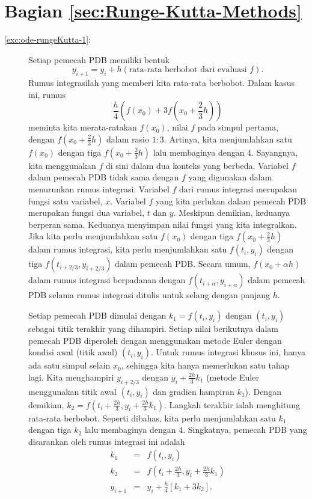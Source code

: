 \section*{Bagian \ref{sec:Runge-Kutta-Methods}}
\begin{description}
\item [{\ref{exc:ode-rungeKutta-1}:}] Setiap pemecah PDB memiliki bentuk
\[
y_{i+1}=y_{i}+h(\mbox{rata-rata berbobot dari evaluasi }f).
\]
Rumus integrasilah yang memberi kita rata-rata berbobot. Dalam kasus
ini, rumus 
\[
\frac{h}{4}\left(f(x_{0})+3f\left(x_{0}+\frac{2}{3}h\right)\right)
\]
 meminta kita merata-ratakan $f(x_{0})$, nilai $f$ pada simpul pertama,
dengan $f(x_{0}+\frac{2}{3}h)$ dalam rasio $1:3$. Artinya, kita
menjumlahkan satu $f(x_{0})$ dengan tiga $f(x_{0}+\frac{2}{3}h)$
lalu membaginya dengan 4. Sayangnya, kita menggunakan $f$ di sini
dalam dua konteks yang berbeda. Variabel $f$ dalam pemecah PDB tidak
sama dengan $f$ yang digunakan dalam menurunkan rumus integrasi.
Variabel $f$ dari rumus integrasi merupakan fungsi satu variabel,
$x$. Variabel $f$ yang kita perlukan dalam pemecah PDB merupakan
fungsi dua variabel, $t$ dan $y$. Meskipun demikian, keduanya berperan
sama. Keduanya menyimpan nilai fungsi yang kita integralkan. Jika
kita perlu menjumlahkan satu $f(x_{0})$ dengan tiga $f(x_{0}+\frac{2}{3}h)$
dalam rumus integrasi, kita perlu menjumlahkan satu $f(t_{i},y_{i})$
dengan tiga $f(t_{i+2/3},y_{i+2/3})$ dalam pemecah PDB. Secara umum,
$f(x_{0}+\alpha h)$ dalam rumus integrasi berpadanan dengan $f(t_{i+\alpha},y_{i+\alpha})$
dalam pemecah PDB selama rumus integrasi ditulis untuk selang dengan
panjang $h$.

Setiap pemecah PDB dimulai dengan $k_{1}=f(t_{i},y_{i})$ dengan $(t_{i},y_{i})$
sebagai titik terakhir yang dihampiri. Setiap nilai berikutnya dalam
pemecah PDB diperoleh dengan menggunakan metode Euler dengan kondisi
awal (titik awal) $(t_{i},y_{i})$. Untuk rumus integrasi khusus ini,
hanya ada satu simpul selain $x_{0}$, sehingga kita hanya memerlukan
satu tahap lagi. Kita menghampiri $y_{i+2/3}$ dengan $y_{i}+\frac{2h}{3}k_{1}$
(metode Euler menggunakan titik awal $(t_{i},y_{i})$ dan gradien
hampiran $k_{1}$). Dengan demikian, $k_{2}=f(t_{i}+\frac{2h}{3},y_{i}+\frac{2h}{3}k_{1})$.
Langkah terakhir ialah menghitung rata-rata berbobot. Seperti dibahas,
kita perlu menjumlahkan satu $k_{1}$ dengan tiga $k_{2}$ lalu membaginya
dengan 4. Singkatnya, pemecah PDB yang disarankan oleh rumus integrasi
ini adalah
\begin{eqnarray*}
k_{1} & = & f(t_{i},y_{i})\\
k_{2} & = & f\left(t_{i}+\frac{2h}{3},y_{i}+\frac{2h}{3}k_{1}\right)\\
y_{i+1} & = & y_{i}+\frac{h}{4}\left[k_{1}+3k_{2}\right].
\end{eqnarray*}


\end{description}
